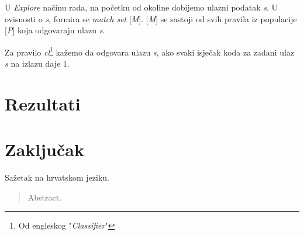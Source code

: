 \documentclass[times, utf8, zavrsni]{fer}
\begin{document}
U \emph{Explore} načinu rada, na početku od okoline dobijemo ulazni podatak \emph{s}.
U ovisnosti o \emph{s}, formira se \emph{match set} [\emph{M}].
[\emph{M}] se sastoji od svih pravila iz populacije [\emph{P}] koja odgovaraju ulazu \emph{s}.

Za pravilo \emph{cl}\footnote{Od engleskog "\emph{Classifier}"} kažemo da odgovara ulazu \emph{s}, ako svaki isječak koda za zadani ulaz \emph{s} na izlazu daje 1.

\chapter{Rezultati}


\chapter{Zaključak}





\begin{sazetak}
Sažetak na hrvatskom jeziku.

\end{sazetak}

\begin{abstract}
Abstract.

\end{abstract}
\end{document}
